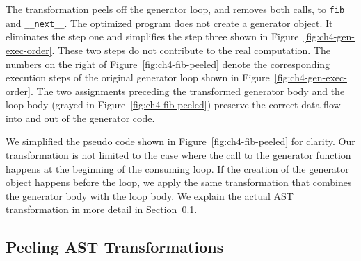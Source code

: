 The transformation peels off the generator loop, and removes both calls, to \texttt{fib} and \texttt{\_\_next\_\_}.
The optimized program does not create a generator object.
It eliminates the step one and simplifies the step three shown in Figure~\ref{fig:ch4-gen-exec-order}.
These two steps do not contribute to the real computation.
The numbers on the right of Figure~\ref{fig:ch4-fib-peeled} denote the corresponding execution steps of the original generator loop shown in Figure~\ref{fig:ch4-gen-exec-order}.
The two assignments preceding the transformed generator body and the loop body (grayed in Figure~\ref{fig:ch4-fib-peeled}) preserve the correct data flow into and out of the generator code.

We simplified the pseudo code shown in Figure~\ref{fig:ch4-fib-peeled} for clarity.
Our transformation is not limited to the case where the call to the generator function happens at the beginning of the consuming loop.
If the creation of the generator object happens before the loop, we apply the same transformation that combines the generator body with the loop body.
We explain the actual AST transformation in more detail in Section~\ref{sec:ch4-ast-transformation}.

\subsection{Peeling AST Transformations}
\label{sec:ch4-ast-transformation}

